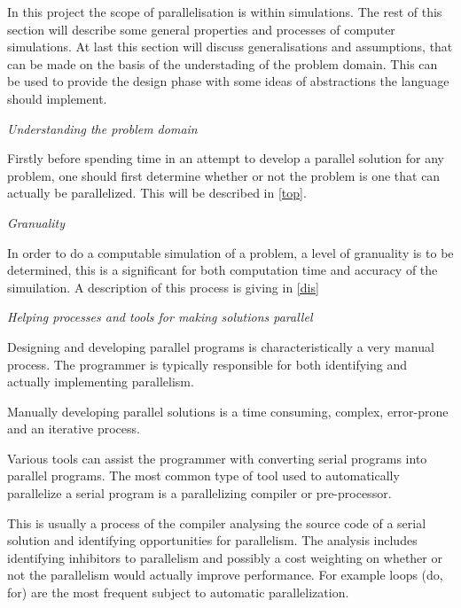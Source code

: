 In this project the scope of parallelisation is within simulations. The rest of this section will describe some general properties and processes of computer simulations. At last this section will discuss generalisations and assumptions, that can be made on the basis of the understading of the problem domain. This can be used to provide the design phase with some ideas of abstractions the language should implement.

\emph{Understanding the problem domain}

Firstly before spending time in an attempt to develop a parallel solution for any problem, one should first determine whether or not the problem is one that can actually be parallelized. This will be described in \cref{top}.

\emph{Granuality}

In order to do a computable simulation of a problem, a level of granuality is to be determined, this is a significant for both computation time and accuracy of the simuilation. A description of this process is giving in \cref{dis}

\emph{Helping processes and tools for making solutions parallel}

Designing and developing parallel programs is characteristically a very manual process. The programmer is typically responsible for both identifying and actually implementing parallelism.

Manually developing parallel solutions is a time consuming, complex, error-prone and an iterative process.

Various tools can assist the programmer with converting serial programs into parallel programs. The most common type of tool used to automatically parallelize a serial program is a parallelizing compiler or pre-processor.

This is usually a process of the compiler analysing the source code of a serial solution and identifying opportunities for parallelism. The analysis includes identifying inhibitors to parallelism and possibly a cost weighting on whether or not the parallelism would actually improve performance. For example loops (do, for) are the most frequent subject to automatic parallelization.

